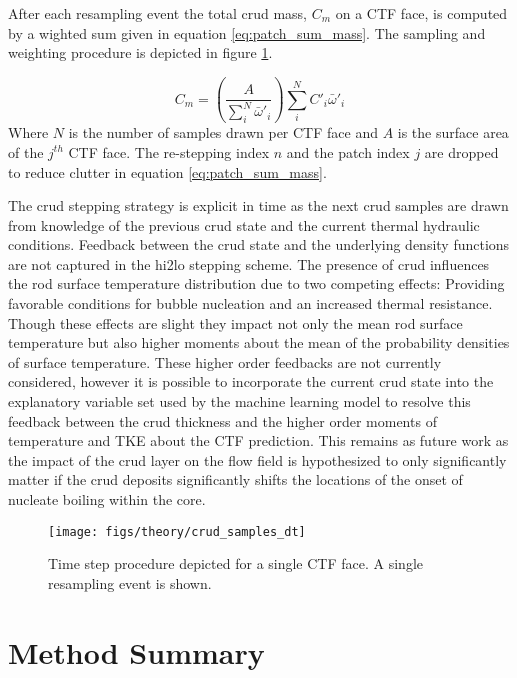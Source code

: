 After each resampling event the total crud mass, $C_m$ on a CTF face, is computed by a wighted sum given in equation \ref{eq:patch_sum_mass}.  The sampling and weighting procedure is depicted in figure \ref{fig:crudsamplesdt}.

\begin{equation}
C_{m} = \left(\frac{A}{\sum_i^N \bar \omega'_i}\right) \sum_i^N C'_i \bar \omega'_i
\label{eq:patch_sum_mass}
\end{equation}
Where $N$ is the number of samples drawn per CTF face and $A$ is the surface area of the $j^{th}$ CTF face.  The re-stepping index $n$ and the patch index $j$ are dropped to reduce clutter in equation \ref{eq:patch_sum_mass}.

The crud stepping strategy is explicit in time as the next crud samples are drawn from knowledge of the previous crud state and the current thermal hydraulic conditions.  Feedback between the crud state and the underlying density functions are not captured in the hi2lo stepping scheme.  The presence of crud influences the rod surface temperature distribution due to two competing effects: Providing favorable conditions for bubble nucleation and an increased thermal resistance.  Though these effects are slight they impact not only the mean rod surface temperature but also higher moments about the mean of the probability densities of surface temperature.  These higher order feedbacks are not currently considered, however it is possible to incorporate the current crud state into the explanatory variable set used by the machine learning model to resolve this feedback between the crud thickness and the higher order moments of temperature and TKE about the CTF prediction.  This remains as future work as the impact of the crud layer on the flow field is hypothesized to only significantly matter if the crud deposits significantly shifts the locations of the onset of nucleate boiling within the core.

\begin{figure}[H]
    \centering
    \texttt{[image: figs/theory/crud\_samples\_dt]}
    \caption[Time step procedure depicted for a single CTF face]{Time step procedure depicted for a single CTF face.  A single resampling event is shown.}
    \label{fig:crudsamplesdt}
\end{figure}

\section{Method Summary}

